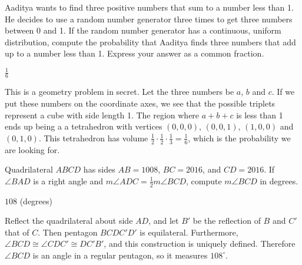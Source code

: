 \documentclass[11pt]{article}
\begin{document}
\begin{problem} %
Aaditya wants to find three positive numbers that sum to a number less than 1. He decides to use a random number generator three times to get three numbers between 0 and 1. If the random number generator has a continuous, uniform distribution, compute the probability that Aaditya finds three numbers that add up to a number less than 1. Express your answer as a common fraction.
\end{problem}

\begin{answer}
$\boxed{\frac{1}{6}}$
\end{answer}

\begin{solution}
This is a geometry problem in secret. Let the three numbers be $a$, $b$ and $c$. If we put these numbers on the coordinate axes, we see that the possible triplets represent a cube with side length 1. The region where $a + b + c$ is less than 1 ends up being a a tetrahedron with vertices $(0, 0, 0)$, $(0, 0, 1)$, $(1, 0, 0)$ and $(0, 1, 0)$. This tetrahedron has volume $\frac{1}{2} \cdot \frac{1}{2} \cdot \frac{1}{3} = \frac{1}{6}$, which is the probability we are looking for.
\end{solution}


\begin{problem}%
Quadrilateral $ABCD$ has sides $AB = 1008$, $BC = 2016$, and $CD = 2016$. If $\angle BAD$ is a right angle and $m\angle ADC = \frac{1}{2}m\angle BCD$, compute $m\angle BCD$ in degrees.
\end{problem}

\begin{answer}
$\boxed{108}$ (degrees)
\end{answer}

\begin{solution}
Reflect the quadrilateral about side $AD$, and let $B'$ be the reflection of $B$ and $C'$ that of $C$. Then pentagon $BCDC'D'$ is equilateral. Furthermore, $\angle BCD \cong \angle CDC' \cong DC'B'$, and this construction is uniquely defined. Therefore $\angle BCD$ is an angle in a regular pentagon, so it measures $\boxed{108^\circ}$.
\end{solution}
\end{document}
